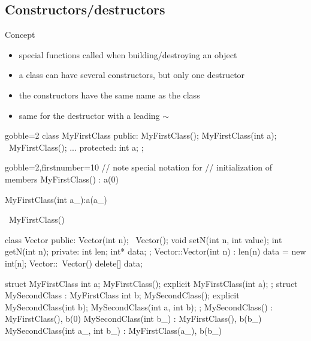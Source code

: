 \subsection[construct]{Constructors/destructors}

\begin{frame}[fragile]
  \begin{block}{Concept}
    \begin{itemize}
    \item special functions called when building/destroying an object
    \item a class can have several constructors, but only one destructor
    \item the constructors have the same name as the class
    \item same for the destructor with a leading $\sim$
    \end{itemize}
  \end{block}
  \begin{multicols}{2}
    \begin{cppcode*}{gobble=2}
      class MyFirstClass {
      public:
        MyFirstClass();
        MyFirstClass(int a);
        ~MyFirstClass();
        ...
      protected:
        int a;
      };
    \end{cppcode*}
    \columnbreak
    \begin{cppcode*}{gobble=2,firstnumber=10}
      // note special notation for
      // initialization of members
      MyFirstClass() : a(0) {}

      MyFirstClass(int a_):a(a_) {}

      ~MyFirstClass() {}
    \end{cppcode*}
  \end{multicols}
\end{frame}


\begin{frame}[fragile]
  \begin{cppcode}
    class Vector {
    public:
      Vector(int n);
      ~Vector();
      void setN(int n, int value);
      int getN(int n);
    private:
      int len;
      int* data;
    };
    Vector::Vector(int n) : len(n) {
      data = new int[n];
    }
    Vector::~Vector() {
      delete[] data;
    }
  \end{cppcode}
\end{frame}

\begin{frame}[fragile]
  \begin{cppcode}
    struct MyFirstClass {
      int a;
      MyFirstClass();
      explicit MyFirstClass(int a);
    };
    struct MySecondClass : MyFirstClass {
      int b;
      MySecondClass();
      explicit MySecondClass(int b);
      MySecondClass(int a, int b);
    };
    MySecondClass() : MyFirstClass(), b(0) {}
    MySecondClass(int b_) : MyFirstClass(), b(b_) {}
    MySecondClass(int a_,
                  int b_) : MyFirstClass(a_), b(b_) {}
  \end{cppcode}
\end{frame}


